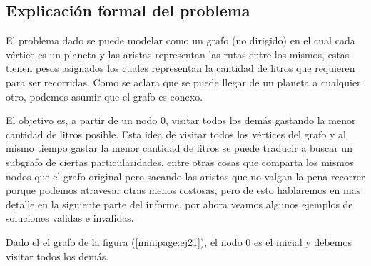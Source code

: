 \subsection{Explicación formal del problema}

El problema dado se puede modelar como un grafo (no dirigido) en el cual cada v\'ertice es un planeta y las aristas representan las rutas entre los mismos, estas tienen pesos asignados los cuales representan la cantidad de litros que requieren para ser recorridas. Como se aclara que se puede llegar de un planeta a cualquier otro, podemos asumir que el grafo es conexo.

El objetivo es, a partir de un nodo 0, visitar todos los demás gastando la menor cantidad de litros posible. Esta idea de visitar todos los v\'ertices del grafo y al mismo tiempo gastar la menor cantidad de litros se puede traducir a buscar un subgrafo de ciertas particularidades, entre otras cosas que comparta los mismos nodos que el grafo original pero sacando las aristas que no valgan la pena recorrer porque podemos atravesar otras menos costosas, pero de esto hablaremos en mas detalle en la siguiente parte del informe, por ahora veamos algunos ejemplos de soluciones validas e invalidas.

Dado el el grafo de la figura (\ref{minipage:ej21}), el nodo 0 es el inicial y debemos visitar todos los demás.

